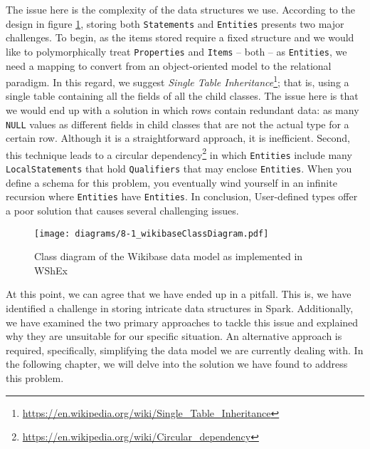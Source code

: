 \begin{code}
    \inputminted{scala}{code/listings/8-2_udtRegistration.scala}
\end{code}

The issue here is the complexity of the data structures we use. According to the design in figure \ref{fig:wikibaseClassDiagram}, storing both \texttt{Statements} and \texttt{Entities} presents two major challenges. To begin, as the items stored require a fixed structure and we would like to polymorphically treat \texttt{Properties} and \texttt{Items} -- both -- as \texttt{Entities}, we need a mapping to convert from an object-oriented model to the relational paradigm. In this regard, we suggest \textit{Single Table Inheritance}\footnote{\url{https://en.wikipedia.org/wiki/Single_Table_Inheritance}}; that is, using a single table containing all the fields of all the child classes. The issue here is that we would end up with a solution in which rows contain redundant data: as many \texttt{NULL} values as different fields in child classes that are not the actual type for a certain row. Although it is a straightforward approach, it is inefficient. Second, this technique leads to a circular dependency\footnote{\url{https://en.wikipedia.org/wiki/Circular_dependency}} in which \texttt{Entities} include many \texttt{LocalStatements} that hold \texttt{Qualifiers} that may enclose \texttt{Entities}. When you define a schema for this problem, you eventually wind yourself in an infinite recursion where \texttt{Entities} have \texttt{Entities}. In conclusion, User-defined types offer a poor solution that causes several challenging issues.

\begin{figure}[ht]
    \centering
    \texttt{[image: diagrams/8-1\_wikibaseClassDiagram.pdf]}
    \caption[Class diagram of the Wikibase data model as implemented in WShEx]{Class diagram of the Wikibase data model as implemented in WShEx\footnotemark}
    \label{fig:wikibaseClassDiagram}
\end{figure}

At this point, we can agree that we have ended up in a pitfall. This is, we have identified a challenge in storing intricate data structures in Spark. Additionally, we have examined the two primary approaches to tackle this issue and explained why they are unsuitable for our specific situation. An alternative approach is required, specifically, simplifying the data model we are currently dealing with. In the following chapter, we will delve into the solution we have found to address this problem.

